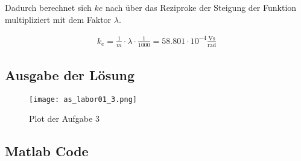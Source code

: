 Dadurch berechnet sich $ke$ nach über das Reziproke der Steigung der Funktion
multipliziert mit dem Faktor $\lambda$.

\begin{equation} \label{eq134}
    \begin{split}
    k_e = \frac{1}{m} \cdot \lambda \cdot \frac{1}{1000} = 58.801 \cdot 10^{-4} \mathrm{\frac{Vs}{rad}}
    \end{split}
\end{equation}




\subsection{Ausgabe der Lösung}
\begin{figure}[H]
 \centering
 \texttt{[image: as\_labor01\_3.png]}
 \caption{Plot der Aufgabe 3}
 \label{fig:PlotAufgabe3}
\end{figure}

\subsection{Matlab Code}

